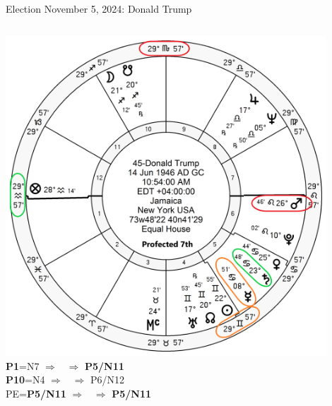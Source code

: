 \begin{frame}[t]{Election November 5, 2024: Donald Trump}
\begin{columns}[T, onlytextwidth]
\vspace{-1em}
{\includegraphics[width=0.9\textwidth]{charts/Trump-Prof-7th.png}}
\fontsize{8pt}{9pt}\selectfont
\textbf{\dgreen P1}=N7
	$\Rightarrow$ \Saturn\, $\Rightarrow$ \textbf{\dgreen P5/N11}\\
\textbf{\red P10}=N4
	$\Rightarrow$ \Mars\, $\Rightarrow$ P6/N12\\
PE=\textbf{\dgreen P5/N11}
	 $\Rightarrow$ \Mercury\, $\Rightarrow$ \textbf{\dgreen P5/N11}

\end{columns}
\end{frame}
